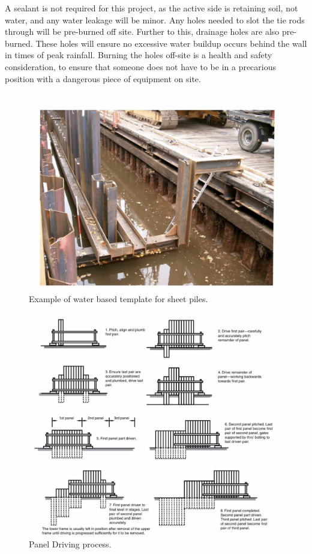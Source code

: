 \documentclass[12pt, a4paper]{article}
\begin{document}
\begin{justify}
A sealant is not required for this project, as the active side is retaining soil, not water, and any water leakage will be minor. Any holes needed to slot the tie rods through will be pre-burned off site. Further to this, drainage holes are also pre-burned. These holes will ensure no excessive water buildup occurs behind the wall in times of peak rainfall. Burning the holes off-site is a health and safety consideration, to ensure that someone does not have to be in a precarious position with a dangerous piece of equipment on site. 
\end{justify}
\begin{figure}[H]
\centering
  	\includegraphics[width=0.5\textheight]{temp}
   	\caption{Example of water based template for sheet piles. \cite{m}}
	\label{temp}
\end{figure}  
\begin{figure}[H]
\centering
  	\includegraphics[width=0.4\textheight]{paneldriving}
   	\caption{Panel Driving process. \cite{m}}
	\label{paneldriving}
\end{figure}     
\end{document}
